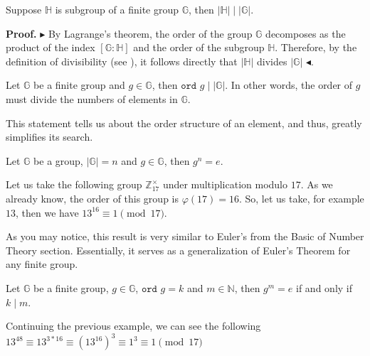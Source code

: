 \documentclass[../lecture-notes-148x210.tex]{subfiles}
\begin{document}
\begin{corollary}
    Suppose $\mathbb{H}$ is subgroup of a finite group $\mathbb{G}$, 
    then $\left| \mathbb{H} \right| \mid \left| \mathbb{G} \right|$.
\end{corollary}

\textbf{Proof.} $\blacktriangleright$ By Lagrange's theorem, the order of the group $\mathbb{G}$ 
decomposes as the product of the index $\left[ \mathbb{G} : \mathbb{H} \right]$ and the order of the 
subgroup $\mathbb{H}$. Therefore, by the definition of divisibility (see ), 
it follows directly that $\left| \mathbb{H} \right|$ divides $\left| \mathbb{G} \right|$ $\blacktriangleleft$.

\begin{corollary}
    Let $\mathbb{G}$ be a finite group and $g \in \mathbb{G}$, 
    then $\texttt{ord } g \mid \left| \mathbb{G} \right|$. In other words, the order of $g$ must 
    divide the numbers of elements in $\mathbb{G}$. 
\end{corollary}

This statement tells us about the order structure of an element, and thus, greatly simplifies its search.

\begin{corollary}
    Let $\mathbb{G}$ be a group, $\left| \mathbb{G} \right| = n$ and $g \in \mathbb{G}$, then $g^{n} = e$.
\end{corollary}

\begin{example}
    Let us take the following group $\mathbb{Z}_{17}^{\times}$ under multiplication modulo $17$. As we 
    already know, the order of this group is $\varphi(17) = 16$. So, let us take, for example $13$, then 
    we have $13^{16} \equiv 1 \pmod{17}$. 
\end{example}

As you may notice, this result is very similar to Euler's  from the Basic of 
Number Theory section. Essentially, it serves as a generalization of Euler's Theorem for any finite group.

\begin{corollary}
    Let $\mathbb{G}$ be a finite group, $g \in \mathbb{G}$, $\texttt{ord } g = k$ and $m \in \mathbb{N}$, 
    then $g^{m} = e$ if and only if $k \mid m$.
\end{corollary}

\begin{example}
    Continuing the previous example, we can see the following $13^{48} \equiv 13^{3*16} \equiv (13^{16})^{3} \equiv 1^{3} \equiv 1 \pmod{17}$
\end{example}
\end{document}
